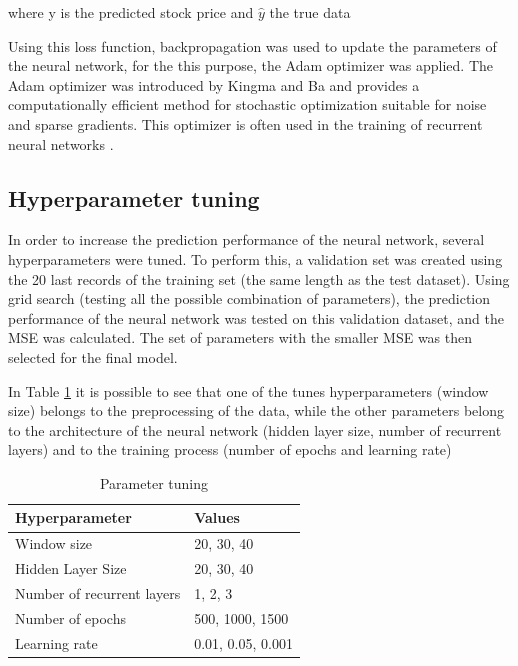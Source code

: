 \documentclass[10pt,twocolumn,letterpaper]{article}
\begin{document}
where y is the predicted stock price and $\hat{y}$ the true data

Using this loss function, backpropagation was used to update the parameters of the neural network, for the this purpose, the Adam optimizer was applied. The Adam optimizer was introduced by Kingma and Ba \cite{Kingma2015} and provides a computationally efficient method for stochastic optimization suitable for noise and sparse gradients. This optimizer is often used in the training of recurrent neural networks \cite{Zhao2020}.

\subsection{Hyperparameter tuning}

In order to increase the prediction performance of the neural network, several hyperparameters were tuned. To perform this, a validation set was created using the 20 last records of the training set (the same length as the test dataset). Using grid search (testing all the possible combination of parameters), the prediction performance of the neural network was tested on this validation dataset, and the MSE was calculated. The set of parameters with the smaller MSE was then selected for the final model.

In Table \ref{table:tuning} it is possible to see that one of the tunes hyperparameters (window size) belongs to the preprocessing of the data, while the other parameters belong to the architecture of the neural network (hidden layer size, number of recurrent layers) and to the training process (number of epochs and learning rate)

\begin{table}[H]
	\begin{center}
		\begin{tabular}{|p{4.2cm}|p{3cm}|}
			\hline
			Hyperparameter & Values \\
			\hline\hline
			Window size & 20, 30, 40\\
			Hidden Layer Size & 20, 30, 40\\
			Number of recurrent layers & 1, 2, 3 \\
			Number of epochs & 500, 1000, 1500\\
			Learning rate & 0.01, 0.05, 0.001\\
			\hline
		\end{tabular}
	\end{center}
	\caption{Parameter tuning}
	\label{table:tuning}
\end{table}
\end{document}
